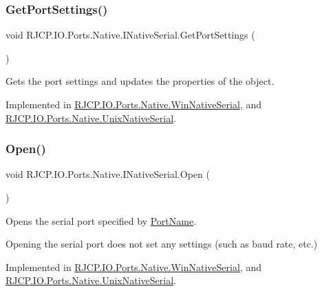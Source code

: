 \subsubsection{\texorpdfstring{GetPortSettings()}{GetPortSettings()}}
{\footnotesize\ttfamily void R\+J\+C\+P.\+I\+O.\+Ports.\+Native.\+I\+Native\+Serial.\+Get\+Port\+Settings (\begin{DoxyParamCaption}{ }\end{DoxyParamCaption})}



Gets the port settings and updates the properties of the object. 



Implemented in \mbox{\hyperlink{class_r_j_c_p_1_1_i_o_1_1_ports_1_1_native_1_1_win_native_serial_a105066f9892f3f00900691a51d5ce40d}{R\+J\+C\+P.\+I\+O.\+Ports.\+Native.\+Win\+Native\+Serial}}, and \mbox{\hyperlink{class_r_j_c_p_1_1_i_o_1_1_ports_1_1_native_1_1_unix_native_serial_afa18ebb0cdd696498f6aca9bef0a556d}{R\+J\+C\+P.\+I\+O.\+Ports.\+Native.\+Unix\+Native\+Serial}}.

\mbox{\label{interface_r_j_c_p_1_1_i_o_1_1_ports_1_1_native_1_1_i_native_serial_aad8e5adb7a536fd4645f387003bed473}} 
\subsubsection{\texorpdfstring{Open()}{Open()}}
{\footnotesize\ttfamily void R\+J\+C\+P.\+I\+O.\+Ports.\+Native.\+I\+Native\+Serial.\+Open (\begin{DoxyParamCaption}{ }\end{DoxyParamCaption})}



Opens the serial port specified by \mbox{\hyperlink{interface_r_j_c_p_1_1_i_o_1_1_ports_1_1_native_1_1_i_native_serial_a842f968b9a75d13f2bf405597513e46a}{Port\+Name}}. 

Opening the serial port does not set any settings (such as baud rate, etc.) 

Implemented in \mbox{\hyperlink{class_r_j_c_p_1_1_i_o_1_1_ports_1_1_native_1_1_win_native_serial_a2f975efd9e94bbc338ba4dbee68a6754}{R\+J\+C\+P.\+I\+O.\+Ports.\+Native.\+Win\+Native\+Serial}}, and \mbox{\hyperlink{class_r_j_c_p_1_1_i_o_1_1_ports_1_1_native_1_1_unix_native_serial_ac8b904202bb173a4575fd8f76472de0d}{R\+J\+C\+P.\+I\+O.\+Ports.\+Native.\+Unix\+Native\+Serial}}.

